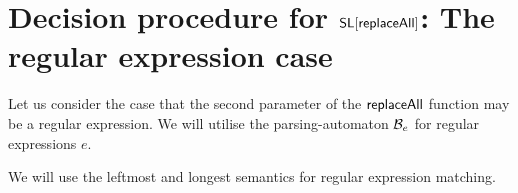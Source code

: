 
\section{Decision procedure for $\mathsf{SL}[\mathsf{replaceAll}]$: The regular expression case}

Let us consider the case that the second parameter of the $\mathsf{replaceAll}$ function may be a regular expression. 
We will utilise the parsing-automaton $\mathcal{B}_e$ for regular expressions $e$. 

We will use the leftmost and longest semantics for regular expression matching.

